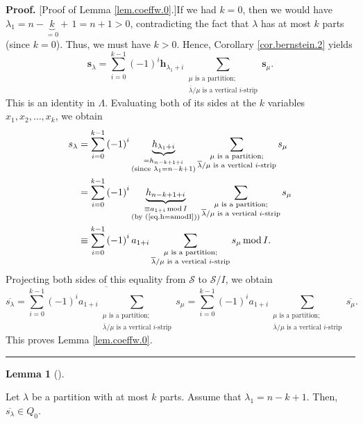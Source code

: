 \documentclass[numbers=enddot,12pt,final,onecolumn,notitlepage]{scrartcl}%
\theoremstyle{definition}
\newtheorem{lem}[theo]{Lemma}
\newenvironment{lemma}[1][]
{\begin{lem}[#1]\begin{leftbar}}
{\end{leftbar}\end{lem}}
\newenvironment{proof}[1][Proof]{\noindent\textbf{#1.} }{\ \rule{0.5em}{0.5em}}
\let\sumnonlimits\sum
\renewcommand{\sum}{\sumnonlimits\limits}
\begin{document}
\begin{proof}
[Proof of Lemma \ref{lem.coeffw.0}.]If we had $k=0$, then we would have
$\lambda_{1}=n-\underbrace{k}_{=0}+\,1=n+1>0$, contradicting the fact that
$\lambda$ has at most $k$ parts (since $k=0$). Thus, we must have $k>0$.
Hence, Corollary \ref{cor.bernstein.2} yields%
\[
\mathbf{s}_{\lambda}=\sum_{i=0}^{k-1}\left(  -1\right)  ^{i}\mathbf{h}%
_{\lambda_{1}+i}\sum_{\substack{\mu\text{ is a partition;}\\\overline{\lambda
}/\mu\text{ is a vertical }i\text{-strip}}}\mathbf{s}_{\mu}.
\]
This is an identity in $\Lambda$. Evaluating both of its sides at the $k$
variables $x_{1},x_{2},\ldots,x_{k}$, we obtain%
\begin{align*}
s_{\lambda}  &  =\sum_{i=0}^{k-1}\left(  -1\right)  ^{i}\underbrace{h_{\lambda
_{1}+i}}_{\substack{=h_{n-k+1+i}\\\text{(since }\lambda_{1}=n-k+1\text{)}%
}}\sum_{\substack{\mu\text{ is a partition;}\\\overline{\lambda}/\mu\text{ is
a vertical }i\text{-strip}}}s_{\mu}\\
&  =\sum_{i=0}^{k-1}\left(  -1\right)  ^{i}\underbrace{h_{n-k+1+i}%
}_{\substack{\equiv a_{1+i}\operatorname{mod}I\\\text{(by (\ref{eq.h=amodI}%
))}}}\sum_{\substack{\mu\text{ is a partition;}\\\overline{\lambda}/\mu\text{
is a vertical }i\text{-strip}}}s_{\mu}\\
&  \equiv\sum_{i=0}^{k-1}\left(  -1\right)  ^{i}a_{1+i}\sum_{\substack{\mu
\text{ is a partition;}\\\overline{\lambda}/\mu\text{ is a vertical
}i\text{-strip}}}s_{\mu}\operatorname{mod}I.
\end{align*}
Projecting both sides of this equality from $\mathcal{S}$ to $\mathcal{S}/I$,
we obtain%
\begin{equation}
\overline{s_{\lambda}}=\overline{\sum_{i=0}^{k-1}\left(  -1\right)
^{i}a_{1+i}\sum_{\substack{\mu\text{ is a partition;}\\\overline{\lambda}%
/\mu\text{ is a vertical }i\text{-strip}}}s_{\mu}}=\sum_{i=0}^{k-1}\left(
-1\right)  ^{i}a_{1+i}\sum_{\substack{\mu\text{ is a partition;}%
\\\overline{\lambda}/\mu\text{ is a vertical }i\text{-strip}}}\overline
{s_{\mu}}.\nonumber
\end{equation}
This proves Lemma \ref{lem.coeffw.0}.
\end{proof}

\begin{lemma}
\label{lem.coeffw.1}Let $\lambda$ be a partition with at most $k$ parts.
Assume that $\lambda_{1}=n-k+1$. Then, $\overline{s_{\lambda}}\in Q_{0}$.
\end{lemma}
\end{document}
